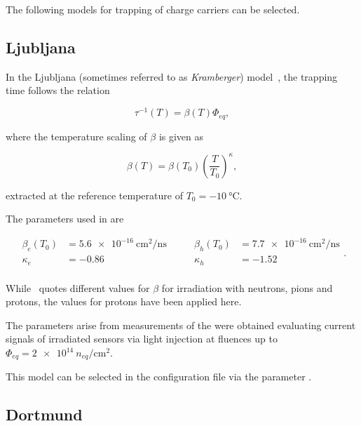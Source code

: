 The following models for trapping of charge carriers can be selected.

\subsection{Ljubljana}
\label{sec:trap:ljubljana}

In the Ljubljana (sometimes referred to as \textit{Kramberger}) model~\cite{kramberger}, the trapping time follows the relation

\begin{equation*}
    \tau^{-1}(T) = \beta(T)\Phi_{eq} ,
\end{equation*}

where the temperature scaling of $\beta$ is given as

\begin{equation*}
  \beta(T) = \beta(T_0)\left(\frac{T}{T_0}\right)^{\kappa},
\end{equation*}

extracted at the reference temperature of $T_0 = \SI{-10}{\celsius}$.

The parameters used in \apsq are

\begin{equation*}
    \begin{split}
        \beta_{e}(T_0) &= \SI{5.6e-16}{\cm^2 \per \ns} \\
        \kappa_{e}   &= -0.86 \\
    \end{split}
    \qquad
    \begin{split}
        \beta_{h}(T_0) &= \SI{7.7e-16}{\cm^2 \per \ns} \\
        \kappa_{h}   &= -1.52 \\
    \end{split}.
\end{equation*}

While~\cite{kramberger} quotes different values for $\beta$ for irradiation with neutrons, pions and protons, the values for protons have been applied here.

The parameters arise from measurements of the were obtained evaluating current signals of irradiated sensors via light injection at fluences up to $\Phi_{eq} = \SI{2e14}{n_{eq} \per \cm^2}$.

This model can be selected in the configuration file via the parameter .

\subsection{Dortmund}

